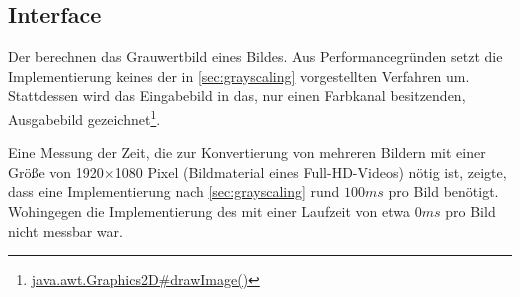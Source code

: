 \subsection{Interface }
Der  berechnen das Grauwertbild eines Bildes.
Aus Performancegründen setzt die Implementierung  keines der in \autoref{sec:grayscaling} vorgestellten Verfahren um.
Stattdessen wird das Eingabebild in das, nur einen Farbkanal besitzenden, Ausgabebild gezeichnet\footnote{\href{http://docs.oracle.com/javase/6/docs/api/java/awt/Graphics2D.html\#drawImage(java.awt.image.BufferedImage, java.awt.image.BufferedImageOp, int, int)}{java.awt.Graphics2D\#drawImage()}}.

Eine Messung der Zeit, die zur Konvertierung von mehreren Bildern mit einer Größe von 1920$\times$1080 Pixel (Bildmaterial eines Full-HD-Videos) nötig ist, zeigte, dass eine Implementierung nach \autoref{sec:grayscaling} rund $100\unit{ms}$ pro Bild benötigt.
Wohingegen die Implementierung des  mit einer Laufzeit von etwa $0\unit{ms}$ pro Bild nicht messbar war.

